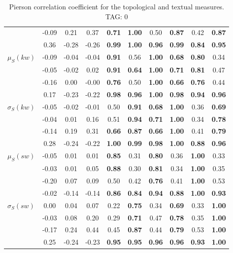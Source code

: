 \begin{table*}[h!]
\begin{center}
\begin{tabular}{| l || c | c | c | c | c | c | c | c | c |}
 & -0.09 & 0.21 & 0.37 & {\bf 0.71} & {\bf 1.00} & 0.50 & {\bf 0.87} & 0.42 & {\bf 0.87} \\
 & 0.36 & -0.28 & -0.26 & {\bf 0.99} & {\bf 1.00} & {\bf 0.96} & {\bf 0.99} & {\bf 0.84} & {\bf 0.95} \\\hline
$\mu_S(kw)$ & -0.09 & -0.04 & -0.04 & {\bf 0.91} & 0.56 & {\bf 1.00} & {\bf 0.68} & {\bf 0.80} & 0.34 \\
 & -0.05 & -0.02 & 0.02 & {\bf 0.91} & {\bf 0.64} & {\bf 1.00} & {\bf 0.71} & {\bf 0.81} & 0.47 \\
 & -0.16 & 0.00 & -0.00 & {\bf 0.76} & 0.50 & {\bf 1.00} & {\bf 0.66} & {\bf 0.76} & 0.44 \\
 & 0.17 & -0.23 & -0.22 & {\bf 0.98} & {\bf 0.96} & {\bf 1.00} & {\bf 0.98} & {\bf 0.94} & {\bf 0.96} \\\hline
$\sigma_S(kw)$ & -0.05 & -0.02 & -0.01 & 0.50 & {\bf 0.91} & {\bf 0.68} & {\bf 1.00} & 0.36 & {\bf 0.69} \\
 & -0.04 & 0.01 & 0.16 & 0.51 & {\bf 0.94} & {\bf 0.71} & {\bf 1.00} & 0.34 & {\bf 0.78} \\
 & -0.14 & 0.19 & 0.31 & {\bf 0.66} & {\bf 0.87} & {\bf 0.66} & {\bf 1.00} & 0.41 & {\bf 0.79} \\
 & 0.28 & -0.24 & -0.22 & {\bf 1.00} & {\bf 0.99} & {\bf 0.98} & {\bf 1.00} & {\bf 0.88} & {\bf 0.96} \\\hline
$\mu_S(sw)$ & -0.05 & 0.01 & 0.01 & {\bf 0.85} & 0.31 & {\bf 0.80} & 0.36 & {\bf 1.00} & 0.33 \\
 & -0.03 & 0.01 & 0.05 & {\bf 0.88} & 0.30 & {\bf 0.81} & 0.34 & {\bf 1.00} & 0.35 \\
 & -0.20 & 0.07 & 0.09 & 0.50 & 0.42 & {\bf 0.76} & 0.41 & {\bf 1.00} & 0.53 \\
 & -0.02 & -0.14 & -0.14 & {\bf 0.86} & {\bf 0.84} & {\bf 0.94} & {\bf 0.88} & {\bf 1.00} & {\bf 0.93} \\\hline
$\sigma_S(sw)$ & 0.00 & 0.04 & 0.07 & 0.22 & {\bf 0.75} & 0.34 & {\bf 0.69} & 0.33 & {\bf 1.00} \\
 & -0.03 & 0.08 & 0.20 & 0.29 & {\bf 0.71} & 0.47 & {\bf 0.78} & 0.35 & {\bf 1.00} \\
 & -0.17 & 0.24 & 0.44 & 0.45 & {\bf 0.87} & 0.44 & {\bf 0.79} & 0.53 & {\bf 1.00} \\
 & 0.25 & -0.24 & -0.23 & {\bf 0.95} & {\bf 0.95} & {\bf 0.96} & {\bf 0.96} & {\bf 0.93} & {\bf 1.00} \\\hline
\end{tabular}
\caption{Pierson correlation coefficient for the topological and textual measures. TAG: 0}
\end{center}
\end{table*}